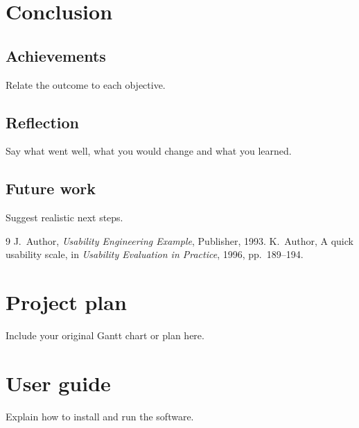 \documentclass[12pt,a4paper]{report}
\begin{document}
\chapter{Conclusion}
\section{Achievements}
Relate the outcome to each objective.
\section{Reflection}
Say what went well, what you would change and what you learned.
\section{Future work}
Suggest realistic next steps.

\begin{thebibliography}{9}
 J.~Author, \emph{Usability Engineering Example}, Publisher, 1993.
 K.~Author, A quick usability scale, in \emph{Usability Evaluation in Practice}, 1996, pp.~189--194.
\end{thebibliography}

\appendix
\chapter{Project plan}
Include your original Gantt chart or plan here.
\chapter{User guide}
Explain how to install and run the software.
\end{document}
